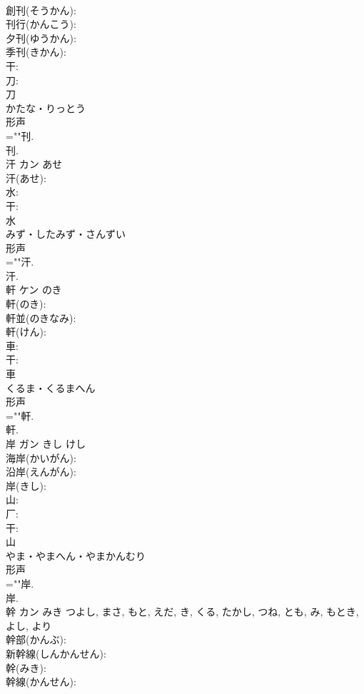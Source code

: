 \documentclass[8pt]{extreport}
\begin{document}
\begin{CJK}{UTF8}{min}
\\	創刊(そうかん): 
\\	刊行(かんこう): 
\\	夕刊(ゆうかん): 
\\	季刊(きかん): 
\\	干: 
\\	刀: 
\\	刀	
\\	かたな・りっとう	
\\	形声 
\\	=""刊.
\\	刊.
\\	汗	カン	あせ		
\\	汗(あせ): 
\\	水: 
\\	干: 
\\	水	
\\	みず・したみず・さんずい	
\\	形声 
\\	=""汗.
\\	汗.
\\	軒	ケン	のき		
\\	軒(のき): 
\\	軒並(のきなみ): 
\\	軒(けん): 
\\	車: 
\\	干: 
\\	車	
\\	くるま・くるまへん	
\\	形声 
\\	=""軒.
\\	軒.
\\	岸	ガン	きし	けし	
\\	海岸(かいがん): 
\\	沿岸(えんがん): 
\\	岸(きし): 
\\	山: 
\\	厂: 
\\	干: 
\\	山	
\\	やま・やまへん・やまかんむり	
\\	形声 
\\	=""岸.
\\	岸.
\\	幹	カン	みき	つよし, まさ, もと, えだ, き, くる, たかし, つね, とも, み, もとき, よし, より	
\\	幹部(かんぶ): 
\\	新幹線(しんかんせん): 
\\	幹(みき): 
\\	幹線(かんせん): 

\end{CJK}
\end{document}
